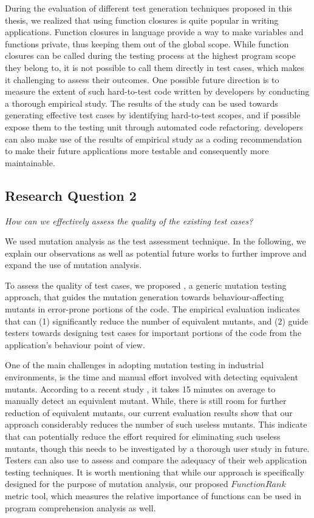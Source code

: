  During the evaluation of different test generation techniques proposed in this thesis, we realized that using function closures is quite popular in writing \javascript applications. 
Function closures in \javascript language provide a way to make variables and functions private, thus keeping them out of the global scope.
While function closures can be called during the testing process at the highest program scope they belong to, it is not possible to call them directly in test cases, which makes it challenging to assess their outcomes.
One possible future direction is to measure the extent of such hard-to-test code written by developers by conducting a thorough empirical study.
The results of the study can be used towards generating effective test cases by identifying hard-to-test scopes, and if possible expose them to the testing unit through automated code refactoring. \javascript developers can also make use of the results of empirical study as a coding recommendation to make their future applications more testable and consequently more maintainable.

\subsection{Research Question 2}

\emph{How can we effectively assess the quality of the existing \javascript test cases?}

We used mutation analysis as the test assessment technique. In the following, we explain our observations as well as potential future works to further improve and expand the use of mutation analysis. 

 To assess the quality of test cases, we proposed \mutandis, a generic mutation testing approach, that guides the mutation generation towards behaviour-affecting mutants in error-prone portions of the code. The empirical evaluation indicates that \mutandis can (1) significantly reduce the number of equivalent mutants, and (2) guide testers towards designing test cases for important portions of the code from the application's behaviour point of view. 

One of the main challenges in adopting mutation testing in industrial environments, is the time and manual effort involved with detecting equivalent mutants. According to a recent study \cite{madeyski:tse13}, it takes 15 minutes on average to manually detect an equivalent mutant. While, there is still room for further reduction of equivalent mutants, our current evaluation results show that our approach considerably reduces the number of such useless mutants. This indicate that \mutandis can potentially reduce the effort required for eliminating such useless mutants, though this needs to be investigated by a thorough user study in future.
Testers can also use \mutandis to assess and compare the adequacy of their web application testing techniques. It is worth mentioning that while our approach is specifically designed for the purpose of mutation analysis, our proposed $FunctionRank$ metric tool, which measures the relative importance of functions can be used in program comprehension analysis as well.  


